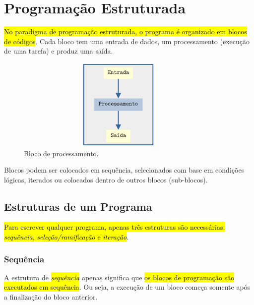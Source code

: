 
\chapter{Programação Estruturada}\label{cap_progest}

\hl{No paradigma de programação estruturada, o programa é organizado em blocos de códigos}. Cada bloco tem uma entrada de dados, um processamento (execução de uma tarefa) e produz uma saída.

\begin{figure}[H]
  \centering
  \includegraphics[max width=0.9\textwidth, max height=1.75in]{./cap_progest/dados/fig_fg_bloco/fig.png}
  \caption{Bloco de processamento.}
  \label{cap_progest:fig:fg_bloco}
\end{figure}

Blocos podem ser colocados em sequência, selecionados com base em condições lógicas, iterados ou colocados dentro de outros blocos (sub-blocos).

\section{Estruturas de um Programa}\label{cap_progest_sec_est}

\hl{Para escrever qualquer programa, apenas três estruturas são necessárias: \emph{sequência}, \emph{seleção/ramificação} e \emph{iteração}}.

\subsection{Sequência}

A estrutura de \hl{\emph{sequência}} apenas significa que \hl{os blocos de programação são executados em sequência}. Ou seja, a execução de um bloco começa somente após a finalização do bloco anterior.

